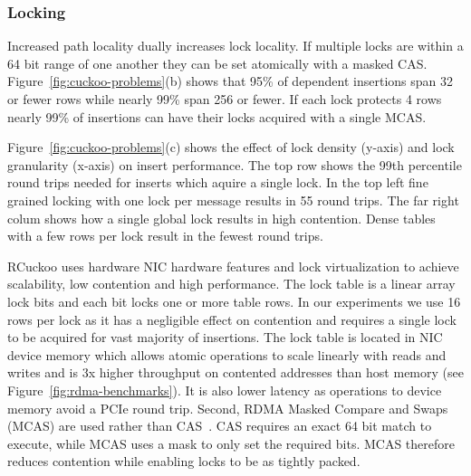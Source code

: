 \subsubsection{Locking}
\label{sec:locking}


Increased path locality dually increases lock locality. If
multiple locks are within a 64 bit range of one another they
can be set atomically with a masked CAS.
Figure~\ref{fig:cuckoo-problems}(b) shows that 95\% of
dependent insertions span 32 or fewer rows while nearly 99\%
span 256 or fewer. If each lock protects 4 rows nearly 99\%
of insertions can have their locks acquired with a single
MCAS.

Figure~\ref{fig:cuckoo-problems}(c) shows the effect of lock
density (y-axis) and lock granularity (x-axis) on insert
performance. The top row shows the 99th percentile round
trips needed for inserts which aquire a single lock. In the
top left fine grained locking with one lock per message
results in 55 round trips. The far right colum shows how a
single global lock results in high contention. Dense tables
with a few rows per lock result in the fewest round trips.


RCuckoo uses hardware NIC hardware features and lock
virtualization to achieve scalability, low contention and
high performance. The lock table is a linear array lock bits
and each bit locks one or more table rows. In our
experiments we use 16 rows per lock as it has a negligible
effect on contention and requires a single lock to be
acquired for vast majority of insertions.
The lock table is located in NIC device memory which allows
atomic operations to scale linearly with reads and writes
and is 3x higher throughput on contented addresses than host
memory (see Figure~\ref{fig:rdma-benchmarks}). It is also
lower latency as operations to device memory avoid a PCIe
round trip.  Second, RDMA Masked Compare and Swaps (MCAS)
are used rather than CAS~\cite{rdma-masked-cas,sherman}. CAS
requires an exact 64 bit match to execute, while MCAS uses a
mask to only set the required bits. MCAS therefore reduces
contention while enabling locks to be as tightly packed.

